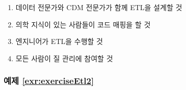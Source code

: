 \documentclass[10.5pt]{book}
\providecommand{\tightlist}{%
  \setlength{\itemsep}{0pt}\setlength{\parskip}{0pt}}
\theoremstyle{definition}
\theoremstyle{definition}
\theoremstyle{definition}
\theoremstyle{remark}
\begin{document}
\begin{enumerate}
\def\labelenumi{\Alph{enumi})}
\tightlist
\item
  데이터 전문가와 CDM 전문가가 함께 ETL을 설계할 것
\item
  의학 지식이 있는 사람들이 코드 매핑을 할 것
\item
  엔지니어가 ETL을 수행할 것
\item
  모든 사람이 질 관리에 참여할 것
\end{enumerate}

\subsubsection*{예제 \ref{exr:exerciseEtl2}}\label{-refexrexerciseetl2}
\end{document}
